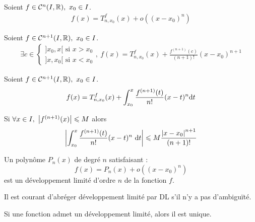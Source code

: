 \begin{theorem}
    Soient $f \in \mathcal{C}^{n}(I, \mathbb{R}),\ x_0 \in I$.
    \begin{align*}
        f(x) = T_{n, x_0}^f(x) + o((x - x_0)^n) 
    \end{align*}
\end{theorem}

\begin{theorem}
    Soient $f \in \mathcal{C}^{n+1}(I, \R),\ x_0 \in I$. 
    \begin{align*}
        \exists c \in 
        \begin{cases}
            ]x_0, x[ \text{ si } x > x_0 \\
            ]x, x_0[ \text{ si } x < x_0
        \end{cases},\
        f(x) = T_{n, x_0}^f(x) + 
        \frac{f^{(n+1)}(c)}{(n+1)!} (x - x_0)^{n+1}
    \end{align*}
\end{theorem}

\begin{theorem}
    Soient $f \in \mathcal{C}^{n+1}(I, \R),\ x_0 \in I$.
    \begin{align*}
        f(x) = T_{n, x_0}^f(x) + \int_{x_0}^{x} \frac{f^{(n+1)}(t)}{n!} (x - t)^n \diffd t
    \end{align*}
\end{theorem}

\begin{corollary}
    Si $\forall x \in I,\ \abs{f^{(n+1)}(x)} \leqslant M$ alors
    \[ \abs{\int_{x_0}^{x} \frac{f^{(n+1)}(t)}{n!} (x - t)^n \ \diffd t} \leq M \frac{\abs{x - x_0}^{n+1}}{(n+1)!} \]
\end{corollary}

\begin{definition}
    Un polynôme $P_n(x)$ de degré $n$ satisfaisant :
    \[ f(x) = P_n(x) + o((x - x_0)^n) \]
    est un développement limité d'ordre $n$ de la fonction $f$.
\end{definition}

\begin{remark}
    Il est courant d'abréger développement limité par DL s'il n'y a pas d'ambiguïté.
\end{remark}

\begin{proposition}
    Si une fonction admet un développement limité, alors il est unique.
\end{proposition}

